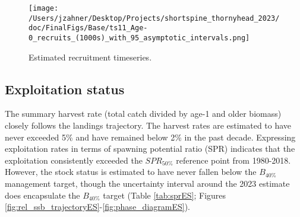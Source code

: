 \documentclass[11pt,
  english,
  letterpaper,
]{article}
\begin{document}
\begin{figure}
\centering
\texttt{[image: /Users/jzahner/Desktop/Projects/shortspine\_thornyhead\_2023/doc/FinalFigs/Base/ts11\_Age-0\_recruits\_(1000s)\_with\_95\_asymptotic\_intervals.png]}
\caption{Estimated recruitment timeseries.\label{fig:rec_trajectoryES}}
\end{figure}

\hypertarget{exploitation-status}{%
\subsection*{Exploitation status}\label{exploitation-status}}

The summary harvest rate (total catch divided by age-1 and older biomass) closely follows the landings trajectory. The harvest rates are estimated to have never exceeded 5\% and have remained below 2\% in the past decade. Expressing exploitation rates in terms of spawning potential ratio (SPR) indicates that the exploitation consistently exceeded the \(SPR_{50\%}\) reference point from 1980-2018. However, the stock status is estimated to have never fallen below the \(B_{40\%}\) management target, though the uncertainty interval around the 2023 estimate does encapsulate the \(B_{40\%}\) target (Table \ref{tab:sprES}; Figures \ref{fig:rel_ssb_trajectoryES}-\ref{fig:phase_diagramES}).

\begingroup\fontsize{10}{12}\selectfont
\begingroup\fontsize{10}{12}\selectfont
\end{document}
